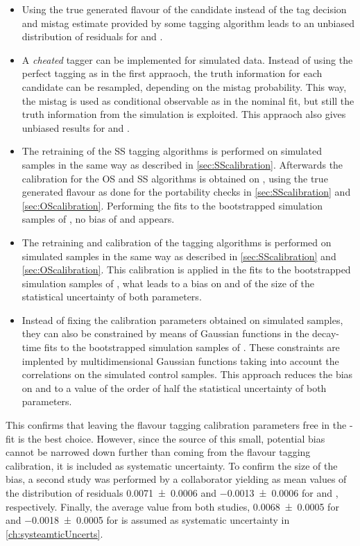 \begin{itemize}
	\item Using the true generated flavour of the \B candidate instead of the tag decision and mistag estimate provided by some tagging algorithm leads to an unbiased distribution of residuals for \Sf and \Sfbar.
	\item A \emph{cheated} tagger can be implemented for simulated data.
	Instead of using the perfect tagging as in the first appraoch, the truth information for each candidate can be resampled, depending on the mistag probability.
	This way, the mistag is used as conditional observable as in the nominal fit, but still the truth information from the simulation is exploited.
	This appraoch also gives unbiased results for \Sf and \Sfbar.
	\item The retraining of the SS tagging algorithms is performed on simulated samples in the same way as described in \cref{sec:SScalibration}.
	Afterwards the calibration for the OS and SS algorithms is obtained on \BdToDpi, using the true generated flavour as done for the portability checks in \cref{sec:SScalibration} and \cref{sec:OScalibration}.
	Performing the fits to the bootstrapped simulation samples of \BdToDpi, no bias of \Sf and \Sfbar appears.
	\item The retraining and calibration of the tagging algorithms is performed on simulated samples in the same way as described in \cref{sec:SScalibration} and \cref{sec:OScalibration}.
	This calibration is applied in the fits to the bootstrapped simulation samples of \BdToDpi, what leads to a bias on \Sf and \Sfbar of the size of the statistical uncertainty of both parameters.
	\item Instead of fixing the calibration parameters obtained on simulated samples, they can also be constrained by means of Gaussian functions in the decay-time fits to the  bootstrapped simulation samples of \BdToDpi .
	These constraints are implented by multidimensional Gaussian functions taking into account the correlations on the simulated control samples.
	This approach reduces the bias on \Sf and \Sfbar to a value of the order of half the statistical uncertainty of both parameters.
\end{itemize}
This confirms that leaving the flavour tagging calibration parameters free in the \CP-fit is the best choice.
However, since the source of this small, potential bias cannot be narrowed down further than coming from the flavour tagging calibration, it is included as systematic uncertainty.
To confirm the size of the bias, a second study was performed by a collaborator yielding as mean values of the distribution of residuals \num{0.0071\pm0.0006} and \num{-0.0013\pm0.0006} for \Sf and \Sfbar, respectively.
Finally, the average value from both studies, \ie \num{0.0068\pm0.0005} for \Sf and \num{-0.0018\pm0.0005} for \Sfbar is assumed as systematic uncertainty in \cref{ch:systeamticUncerts}.
